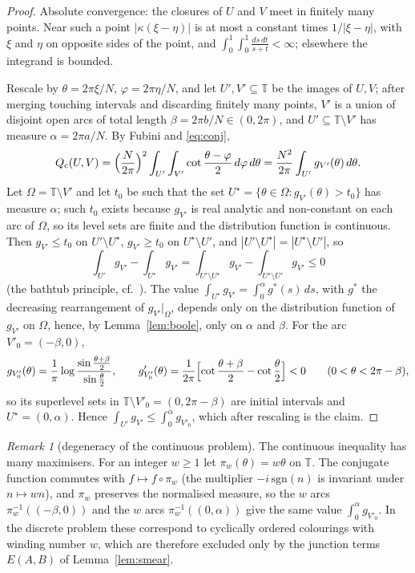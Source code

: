 \documentclass[11pt]{amsart}
\theoremstyle{definition}
\theoremstyle{remark}
\newtheorem{remark}[theorem]{Remark}
\newcommand{\T}{\mathbb{T}}
\newcommand{\Qc}{Q_{\mathrm{c}}}
\begin{document}
\begin{proof}
Absolute convergence: the closures of $U$ and $V$ meet in finitely many points. Near such a point $|\kappa(\xi-\eta)|$
is at most a constant times $1/|\xi-\eta|$, with $\xi$ and $\eta$ on opposite sides of the point, and
$\int_0^{1}\int_0^{1}\frac{ds\,dt}{s+t}<\infty$; elsewhere the integrand is bounded.

Rescale by $\theta=2\pi\xi/N$, $\varphi=2\pi\eta/N$, and let $U',V'\subseteq\T$ be the images of $U,V$; after merging
touching intervals and discarding finitely many points, $V'$ is a union of disjoint open arcs of total length
$\beta=2\pi b/N\in(0,2\pi)$, and $U'\subseteq\T\setminus V'$ has measure $\alpha=2\pi a/N$. By Fubini and
\eqref{eq:conj},
\[
\Qc(U,V)=\Bigl(\frac N{2\pi}\Bigr)^2\int_{U'}\int_{V'}\cot\frac{\theta-\varphi}2\,d\varphi\,d\theta
=\frac{N^2}{2\pi}\int_{U'}g_{V'}(\theta)\,d\theta .
\]
Let $\Omega=\T\setminus V'$ and let $t_0$ be such that the set $U^\star=\{\theta\in\Omega:g_{V'}(\theta)>t_0\}$
has measure $\alpha$; such $t_0$ exists because $g_{V'}$ is real analytic and non-constant on each arc of $\Omega$,
so its level sets are finite and the distribution function is continuous. Then $g_{V'}\le t_0$ on
$U'\setminus U^\star$, $g_{V'}\ge t_0$ on $U^\star\setminus U'$, and $|U'\setminus U^\star|=|U^\star\setminus U'|$, so
\[
\int_{U'}g_{V'}-\int_{U^\star}g_{V'}=\int_{U'\setminus U^\star}g_{V'}-\int_{U^\star\setminus U'}g_{V'}\le0
\]
(the bathtub principle, cf.~\cite[Thm.~1.14]{LL}). The value $\int_{U^\star}g_{V'}=\int_0^{\alpha}g^*(s)\,ds$, with $g^*$
the decreasing rearrangement of $g_{V'}|_\Omega$, depends only on the distribution function of $g_{V'}$ on
$\Omega$, hence, by Lemma~\ref{lem:boole}, only on $\alpha$ and $\beta$. For the arc $V'_0=(-\beta,0)$,
\[
g_{V'_0}(\theta)=\frac1\pi\log\frac{\sin\frac{\theta+\beta}2}{\sin\frac\theta2},\qquad
g_{V'_0}'(\theta)=\frac1{2\pi}\Bigl[\cot\frac{\theta+\beta}2-\cot\frac\theta2\Bigr]<0\qquad(0<\theta<2\pi-\beta),
\]
so its superlevel sets in $\T\setminus V'_0=(0,2\pi-\beta)$ are initial intervals and $U^\star=(0,\alpha)$. Hence
$\int_{U'}g_{V'}\le\int_0^\alpha g_{V'_0}$, which after rescaling is the claim.
\end{proof}

\begin{remark}[degeneracy of the continuous problem]\label{rem:degenerate}
The continuous inequality has many maximisers. For an integer $w\ge1$ let $\pi_w(\theta)=w\theta$ on $\T$. The
conjugate function commutes with $f\mapsto f\circ\pi_w$ (the multiplier $-i\,\mathrm{sgn}(n)$ is invariant under
$n\mapsto wn$), and $\pi_w$ preserves the normalised measure, so the $w$ arcs $\pi_w^{-1}((-\beta,0))$ and the $w$
arcs $\pi_w^{-1}((0,\alpha))$ give the same value $\int_0^\alpha g_{V'_0}$. In the discrete problem these
correspond to cyclically ordered colourings with winding number $w$, which are therefore excluded only by the
junction terms $E(A,B)$ of Lemma~\ref{lem:smear}.
\end{remark}
\end{document}
